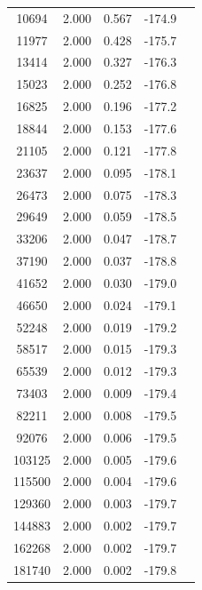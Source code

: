 \begin{longtable}{
  S[table-format=6.0]
  S[table-format=2.3]
  S[table-format=2.3]
  S[table-format=+3.1]
  c}
  10694 & 2.000 & 0.567 & -174.9 & \\
  11977 & 2.000 & 0.428 & -175.7 & \\
  13414 & 2.000 & 0.327 & -176.3 & \\
  15023 & 2.000 & 0.252 & -176.8 & \\
  16825 & 2.000 & 0.196 & -177.2 & \\
  18844 & 2.000 & 0.153 & -177.6 & \\
  21105 & 2.000 & 0.121 & -177.8 & \\
  23637 & 2.000 & 0.095 & -178.1 & \\
  26473 & 2.000 & 0.075 & -178.3 & \\
  29649 & 2.000 & 0.059 & -178.5 & \\
  33206 & 2.000 & 0.047 & -178.7 & \\
  37190 & 2.000 & 0.037 & -178.8 & \\
  41652 & 2.000 & 0.030 & -179.0 & \\
  46650 & 2.000 & 0.024 & -179.1 & \\
  52248 & 2.000 & 0.019 & -179.2 & \\
  58517 & 2.000 & 0.015 & -179.3 & \\
  65539 & 2.000 & 0.012 & -179.3 & \\
  73403 & 2.000 & 0.009 & -179.4 & \\
  82211 & 2.000 & 0.008 & -179.5 & \\
  92076 & 2.000 & 0.006 & -179.5 & \\
  103125 & 2.000 & 0.005 & -179.6 & \\
  115500 & 2.000 & 0.004 & -179.6 & \\
  129360 & 2.000 & 0.003 & -179.7 & \\
  144883 & 2.000 & 0.002 & -179.7 & \\
  162268 & 2.000 & 0.002 & -179.7 & \\
  181740 & 2.000 & 0.002 & -179.8 & \\
\end{longtable}

